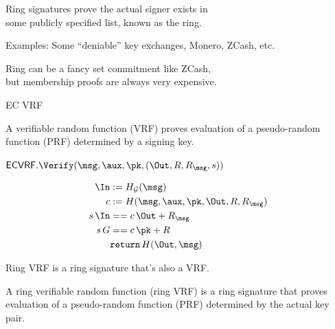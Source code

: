 \documentclass{beamer}
\begin{document}



\begin{frame}
	
Ring signatures prove the actual signer exists in \\
\hspace{10pt} some publicly specified list, known as the ring.

\bigskip\bigskip

Examples:  Some ``deniable'' key exchanges, Monero, ZCash, etc.

\bigskip\bigskip

Ring can be a fancy set commitment like ZCash, \\
\hspace{10pt} but membership proofs are always very expensive.
	
\end{frame}



\begin{frame}{EC VRF}

A verifiable random function (VRF) proves evaluation of a pseudo-random function (PRF) determined by a signing key.

\bigskip\bigskip

$\mathsf{ECVRF}.\Verify(\msg,\aux,\pk,(\Out,R,R_\msg,s))$
	
$$ \begin{aligned}
\In &:= H_{\mathcal{G}}(\msg) \\
c &:= H(\msg,\aux,\pk,\Out,R,R_\msg) \\
s \, \In &== c \, \Out + R_\msg \\
s \, G &== c \, \pk + R \\
& \mathtt{return}\, H(\Out,\msg) \\
\end{aligned} $$
	
\end{frame}



\begin{frame}

Ring VRF is a ring signature that's also a VRF.

\bigskip\bigskip 

A ring verifiable random function (ring VRF) is a ring signature that proves evaluation of a pseudo-random function (PRF) determined by the actual key pair.

\end{frame}
\end{document}
